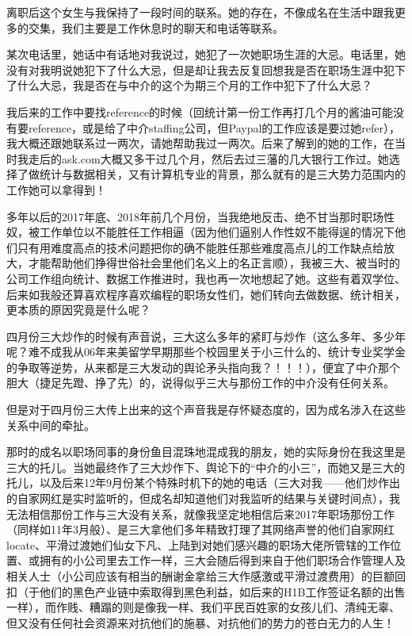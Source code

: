 \documentclass[9pt, b5paper]{article}
\begin{document}
离职后这个女生与我保持了一段时间的联系。她的存在，不像成名在生活中跟我更多的交集，我们主要是工作休息时的聊天和电话等联系。

某次电话里，她话中有话地对我说过，她犯了一次她职场生涯的大忌。电话里，她没有对我明说她犯下了什么大忌，但是却让我去反复回想我是否在职场生涯中犯下了什么大忌，我是否在与中介的这个为期三个月的工作中犯下了什么大忌？

我后来的工作中要找reference的时候（回统计第一份工作再打几个月的酱油可能没有要reference，或是给了中介staffing公司，但Paypal的工作应该是要过她refer），我大概还跟她联系过一两次，请她帮助我过一两次。后来了解到的她的工作，在当时我走后的ask.com大概又多干过几个月，然后去过三藩的几大银行工作过。她选择了做统计与数据相关，又有计算机专业的背景，那么就有的是三大势力范围内的工作她可以拿得到！

多年以后的2017年底、2018年前几个月份，当我绝地反击、绝不甘当那时职场性奴，被工作单位以不能胜任工作相逼（因为他们逼别人作性奴不能得逞的情况下他们只有用难度高点的技术问题把你的确不能胜任那些难度高点儿的工作缺点给放大，才能帮助他们挣得世俗社会里他们名义上的名正言顺），我被三大、被当时的公司工作组向统计、数据工作推进时，我也再一次地想起了她。这些有着双学位、后来如我般还算喜欢程序喜欢编程的职场女性们，她们转向去做数据、统计相关，更本质的原因究竟是什么呢？ 

四月份三大炒作的时候有声音说，三大这么多年的紧盯与炒作（这么多年、多少年呢？难不成我从06年来美留学早期那些个校园里关于小三什么的、统计专业奖学金的争取等逆势，从来都是三大发动的舆论矛头指向我？！！！），便宜了中介那个胆大（捷足先蹬、挣了先）的，说得似乎三大与那份工作的中介没有任何关系。

但是对于四月份三大传上出来的这个声音我是存怀疑态度的，因为成名涉入在这些关系中间的牵扯。 

那时的成名以职场同事的身份鱼目混珠地混成我的朋友，她的实际身份在我这里是三大的托儿。当她最终作了三大炒作下、舆论下的“中介的小三”，而她又是三大的托儿，以及后来12年9月份某个特殊时机下的她的电话（三大对我——他们炒作出的自家网红是实时监听的，但成名却知道他们对我监听的结果与关键时间点），我无法相信那份工作与三大没有关系，就像我坚定地相信后来2017年职场那份工作（同样如11年3月般）、是三大拿他们多年精致打理了其网络声誉的他们自家网红locate、平滑过渡她们仙女下凡、上陆到对她们感兴趣的职场大佬所管辖的工作位置、或拥有的小公司里去工作一样，三大会随后得到来自于他们职场合作管理人及相关人士（小公司应该有相当的酬谢金拿给三大作感激或平滑过渡费用）的巨额回扣（于他们的黑色产业链中索取得到黑色利益，如后来的H1B工作签证名额的出售一样），而作贱、糟蹋的则是像我一样、我们平民百姓家的女孩儿们、清纯无辜、但又没有任何社会资源来对抗他们的施暴、对抗他们的势力的苍白无力的人生！
\end{document}
